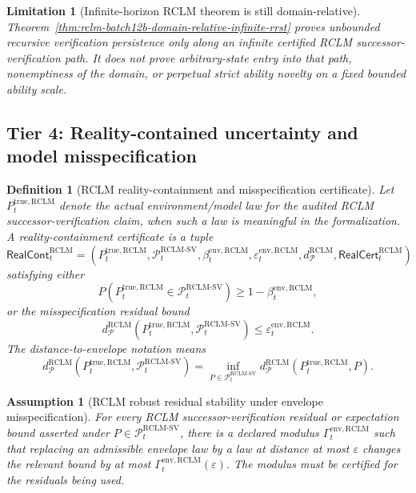 \documentclass[11pt,a4paper]{article}
\newtheorem{definition}[theorem]{Definition}
\newtheorem{assumption}[theorem]{Assumption}
\newtheorem{limitation}[theorem]{Limitation}
\newcommand{\Pcal}{\mathcal P}
\newcommand{\RCLM}{\mathrm{RCLM}}
\newcommand{\true}{\mathrm{true}}
\begin{document}
\begin{limitation}[Infinite-horizon RCLM theorem is still domain-relative]
\label{lim:rclm-batch12b-infinite-horizon-domain-relative}
Theorem~\ref{thm:rclm-batch12b-domain-relative-infinite-rrst} proves unbounded recursive verification persistence only along an infinite certified RCLM successor-verification path. It does not prove arbitrary-state entry into that path, nonemptiness of the domain, or perpetual strict ability novelty on a fixed bounded ability scale.
\end{limitation}

\subsection{Tier 4: Reality-contained uncertainty and model misspecification}

\begin{definition}[RCLM reality-containment and misspecification certificate]
\label{def:rclm-batch12b-reality-containment-certificate}
Let \(P_t^{\true,\RCLM}\) denote the actual environment/model law for the audited RCLM successor-verification claim, when such a law is meaningful in the formalization. A reality-containment certificate is a tuple
\[
\mathsf{RealCont}_t^{\RCLM}
=(P_t^{\true,\RCLM},\Pcal_t^{\RCLM\text{-}\mathrm{SV}},\beta_t^{\mathrm{env},\RCLM},\varepsilon_t^{\mathrm{env},\RCLM},d_{\Pcal}^{\RCLM},\mathsf{RealCert}_t^{\RCLM})
\]
satisfying either
\[
P(P_t^{\true,\RCLM}\in\Pcal_t^{\RCLM\text{-}\mathrm{SV}})
\ge
1-\beta_t^{\mathrm{env},\RCLM},
\]
or the misspecification residual bound
\[
d_{\Pcal}^{\RCLM}(P_t^{\true,\RCLM},\Pcal_t^{\RCLM\text{-}\mathrm{SV}})
\le
\varepsilon_t^{\mathrm{env},\RCLM}.
\]
The distance-to-envelope notation means
\[
d_{\Pcal}^{\RCLM}(P_t^{\true,\RCLM},\Pcal_t^{\RCLM\text{-}\mathrm{SV}})
=
\inf_{P\in\Pcal_t^{\RCLM\text{-}\mathrm{SV}}}
d_{\Pcal}^{\RCLM}(P_t^{\true,\RCLM},P).
\]
\end{definition}

\begin{assumption}[RCLM robust residual stability under envelope misspecification]
\label{ass:rclm-batch12b-residual-stability-under-misspecification}
For every RCLM successor-verification residual or expectation bound asserted under \(P\in\Pcal_t^{\RCLM\text{-}\mathrm{SV}}\), there is a declared modulus \(\Gamma_t^{\mathrm{env},\RCLM}\) such that replacing an admissible envelope law by a law at distance at most \(\varepsilon\) changes the relevant bound by at most \(\Gamma_t^{\mathrm{env},\RCLM}(\varepsilon)\). The modulus must be certified for the residuals being used.
\end{assumption}
\end{document}
